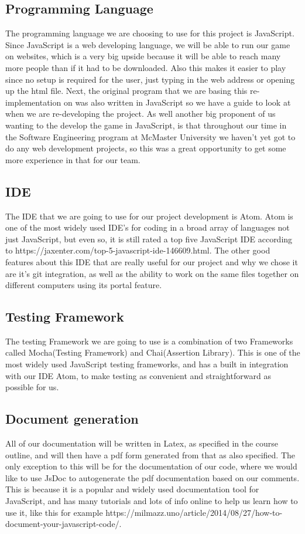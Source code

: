 \documentclass{article}
\begin{document}
\subsection{Programming Language}
The programming language we are choosing to use for this project is JavaScript. Since JavaScript is a web developing language, we will be able to run our game on websites, which is a very big upside because it will be able to reach many more people than if it had to be downloaded. Also this makes it easier to play since no setup is required for the user, just typing in the web address or opening up the html file. Next, the original program that we are basing this re-implementation on was also written in JavaScript so we have a guide to look at when we are re-developing the project. As well another big proponent of us wanting to the develop the game in JavaScript, is that throughout our time in the Software Engineering program at McMaster University we haven’t yet got to do any web development projects, so this was a great opportunity to get some more experience in that for our team.
\subsection{IDE}
The IDE that we are going to use for our project development is Atom. Atom is one of the most widely used IDE’s for coding in a broad array of languages not just JavaScript, but even so, it is still rated a top five JavaScript IDE according to https://jaxenter.com/top-5-javascript-ide-146609.html. The other good features about this IDE that are really useful for our project and why we chose it are it’s git integration, as well as the ability to work on the same files together on different computers using its portal feature.
\subsection{Testing Framework}
The testing Framework we are going to use is a combination of two Frameworks called Mocha(Testing Framework) and Chai(Assertion Library). This is one of the most widely used JavaScript testing frameworks, and has a built in integration with our IDE Atom, to make testing as convenient and straightforward as possible for us.
\subsection{Document generation}
All of our documentation will be written in Latex, as specified in the course outline, and will then have a pdf form generated from that as also specified. The only exception to this will be for the documentation of our code, where we would like to use JsDoc to autogenerate the pdf documentation based on our comments. This is because it is a popular and widely used documentation tool for JavaScript, and has many tutorials and lots of info online to help us learn how to use it, like this for example https://milmazz.uno/article/2014/08/27/how-to-document-your-javascript-code/.
\end{document}
